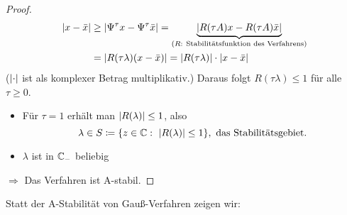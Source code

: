 \begin{proof}
\begin{align*}
		\lvert x-\bar x \rvert &\geq \lvert \Psi^\tau x - \Psi^\tau \bar x \rvert = \underbrace{\lvert R(\tau A)x- R(\tau A)\bar x \rvert}_{(R:\  \text{Stabilitätsfunktion des Verfahrens})} \\
		&= \lvert R(\tau\lambda) (x-\bar x) \rvert = \lvert R(\tau\lambda) \rvert\cdot\lvert x-\bar x \rvert
	\end{align*}
	($\lvert \cdot \rvert$ ist als komplexer Betrag multiplikativ.) Daraus folgt $R(\tau\lambda)\leq 1$ für alle $\tau\geq0$.
	\begin{itemize}
		\item Für $\tau=1$ erhält man $\lvert R(\lambda) \rvert \leq 1$, also
		\begin{equation*}
			\lambda\in S\coloneqq \{ z\in\C:\ \abs{R(\lambda)}\leq 1 \},\ \text{das Stabilitätsgebiet}.
		\end{equation*}
		\item $\lambda$ ist in $\mathbb C_-$ beliebig
	\end{itemize}
	$\Rightarrow$ Das Verfahren ist A-stabil.
\end{proof}

Statt der A-Stabilität von Gauß-Verfahren zeigen wir:

